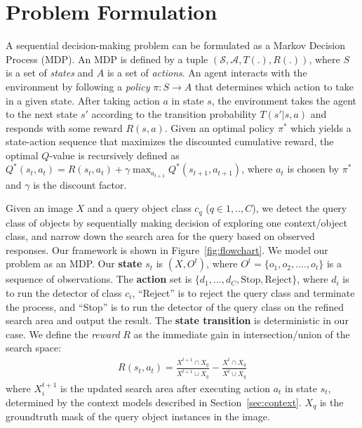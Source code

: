 \section{Problem Formulation}
A sequential decision-making problem can be formulated as a Markov Decision
Process (MDP).
An MDP is defined by a tuple $(\mathcal{S}, \mathcal{A}, T(.), R(.))$,
where $S$ is a set of \textit{states} and $A$ is a set of
\textit{actions}. An agent interacts with the
environment by following a
\textit{policy} $\pi: S \rightarrow A$ that determines which action to take in a
given state. After taking action $a$ in
state $s$, the environment takes the
agent to the next state $s'$ according to the transition probability $T(s'|s,a)$
and responds with some reward $R(s,a)$.
Given an optimal policy $\pi^\ast$ which yields a state-action sequence that maximizes the discounted cumulative reward,
the optimal $Q$-value is recursively defined as $Q^\ast(s_t, a_t) = R(s_t, a_t) + \gamma\max_{a_{t+1}}Q^\ast(s_{t+1}, a_{t+1})$, where $a_t$ is chosen by $\pi^\ast$ and $\gamma$ is the discount factor.

Given an image $X$ and a query object class $c_q$ ($q \in {1,..,C}$),
we detect the query class of objects by sequentially making decision of exploring one context/object class, and narrow down the search area for the query based on observed responses. Our framework is shown in Figure~\ref{fig:flowchart}.
We model our problem as an MDP.
Our \textbf{state} $s_t$ is $(X, O^t)$, where  $O^t= \{o_1, o_2, ....,o_t\}$ is a sequence of observations.
The \textbf{action} set is $\{d_1, ..., d_C, \mbox{Stop}, \mbox{Reject}\}$, where $d_i$ is to run the detector of class $c_i$, ``Reject'' is to reject the query class and terminate the process, and ``Stop'' is to run the detector of the query class on the refined search area and output the result.
The \textbf{state transition} is deterministic in our case.
We define the \textit{reward} $R$ as the immediate gain in intersection/union of the search space:
\begin{eqnarray}
\label{eq:imreward}
R(s_t,a_t) =  \frac{X^{t+1} \cap X_q}{X^{t+1} \cup X_q} - \frac{X^{t}\cap X_q}{X^{t} \cup X_q}
\end{eqnarray}
where $X^{t+1}_i$ is the updated search area after executing action $a_t$ in state $s_t$, determined by the context models described in Section~\ref{sec:context}. $X_q$ is the groundtruth mask of the query object instances in the image. 

